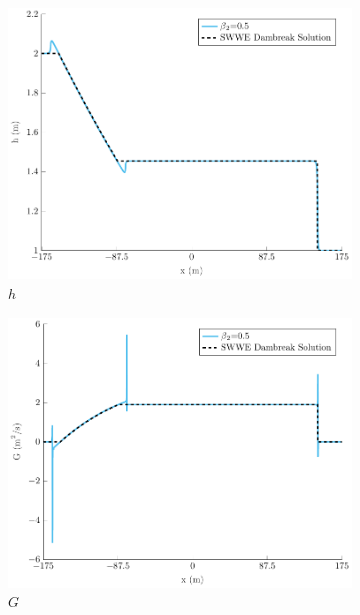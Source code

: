 \documentclass[10pt]{article}
\begin{document}
\begin{figure}
	\centering
	\begin{subfigure}{0.32\textwidth}
		\centering
		\includegraphics[width=\textwidth]{./Figures/Simulations/Study/RegSWWE/Convergence/h.pdf}
		\caption{$h$}
	\end{subfigure}
	\begin{subfigure}{0.32\textwidth}
	\centering
	\includegraphics[width=\textwidth]{./Figures/Simulations/Study/RegSWWE/Convergence/G.pdf}
	\caption{$G$}
	\end{subfigure}
	\begin{subfigure}{0.32\textwidth}
	\centering

\end{subfigure}
\end{figure}
\end{document}
